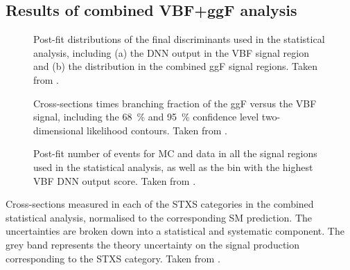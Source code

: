 \subsection{Results of combined VBF+ggF analysis}

\begin{figure}
    \caption{Post-fit distributions of the final discriminants used in the statistical analysis, including (a) the DNN output in the VBF signal region and (b) the \mT distribution in the combined ggF signal regions. Taken from .}
    \label{fig:post-fit-final-discriminatns}
\end{figure}

\begin{figure}
    \caption{Cross-sections times branching fraction of the ggF versus the VBF signal, including the \SI{68}{\percent} and \SI{95}{\percent} confidence level two-dimensional likelihood contours. Taken from .}
    \label{fig:avocado-plot}
\end{figure}

\begin{figure}
    \caption{Post-fit number of events for MC and data in all the signal regions used in the statistical analysis, as well as the bin with the highest VBF DNN output score. Taken from .}
    \label{fig:post-fit-yields}
\end{figure}



\begin{table}
    \caption{Cross-sections measured in each of the STXS categories in the combined statistical analysis, normalised to the corresponding SM prediction. The uncertainties are broken down into a statistical and systematic component. The grey band represents the theory uncertainty on the signal production corresponding to the STXS category. Taken from .}
    \label{fig:stxs-pois-bar-plot}
\end{table}

